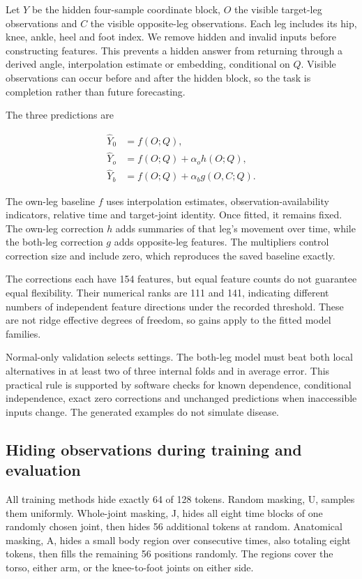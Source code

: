 \documentclass[letterpaper]{article}
\begin{document}
Let \(Y\) be the hidden four-sample coordinate block, \(O\) the visible target-leg observations and \(C\) the visible opposite-leg observations. Each leg includes its hip, knee, ankle, heel and foot index. We remove hidden and invalid inputs before constructing features. This prevents a hidden answer from returning through a derived angle, interpolation estimate or embedding, conditional on \(Q\). Visible observations can occur before and after the hidden block, so the task is completion rather than future forecasting.

The three predictions are

\begin{align}
\widehat Y_0 &= f(O;Q),\\
\widehat Y_o &= f(O;Q)+\alpha_o h(O;Q),\\
\widehat Y_b &= f(O;Q)+\alpha_b g(O,C;Q).
\end{align}

The own-leg baseline \(f\) uses interpolation estimates, observation-availability indicators, relative time and target-joint identity. Once fitted, it remains fixed. The own-leg correction \(h\) adds summaries of that leg's movement over time, while the both-leg correction \(g\) adds opposite-leg features. The multipliers control correction size and include zero, which reproduces the saved baseline exactly.

The corrections each have 154 features, but equal feature counts do not guarantee equal flexibility. Their numerical ranks are 111 and 141, indicating different numbers of independent feature directions under the recorded threshold. These are not ridge effective degrees of freedom, so gains apply to the fitted model families.

Normal-only validation selects settings. The both-leg model must beat both local alternatives in at least two of three internal folds and in average error. This practical rule is supported by software checks for known dependence, conditional independence, exact zero corrections and unchanged predictions when inaccessible inputs change. The generated examples do not simulate disease.

\subsection{Hiding observations during training and evaluation}

All training methods hide exactly 64 of 128 tokens. Random masking, U, samples them uniformly. Whole-joint masking, J, hides all eight time blocks of one randomly chosen joint, then hides 56 additional tokens at random. Anatomical masking, A, hides a small body region over consecutive times, also totaling eight tokens, then fills the remaining 56 positions randomly. The regions cover the torso, either arm, or the knee-to-foot joints on either side.
\end{document}
